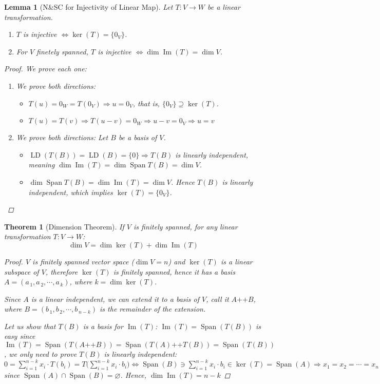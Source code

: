 \documentclass[12pt]{article}
\let\emptyset\varnothing
\let\RA\Rightarrow
\let\LA\Leftarrow
\let\LR\Leftrightarrow
\newcommand{\seq}[2]{\left({#1}_{\,1},{#1}_{\,2},\cdots,{#1}_{\,#2}\right)}
\DeclareMathOperator{\Image}{Im}
\DeclareMathOperator{\Span}{Span}
\DeclareMathOperator{\LD}{LD}
\DeclareMathOperator{\concat}{++}
\newtheorem{theorem}{Theorem}[subsection]
\newtheorem{lemma}{Lemma}[subsection]
\begin{document}
\begin{lemma}[N\&SC for Injectivity of Linear Map]
  Let $T: V \to W$ be a linear transformation.
  \begin{enumerate}
    \item $T$ is injective $\LR \ker(T)=\{0_V\}$.
    \item For $V$ finetely spanned, $T$ is injective $\LR \dim\Image(T)=\dim V$.
  \end{enumerate}
  \begin{proof}
    We prove each one:
    \begin{enumerate}
      \item We prove both directions:
      \begin{itemize}
        \item [$(\RA)$] $T(u)=0_W=T(0_V)\RA u=0_V$, that is, $\{0_V\}\supseteq \ker(T)$.
        \item [$(\LA)$] $T(u)=T(v)\RA T(u-v)=0_W\RA u-v=0_V\RA u=v$
      \end{itemize}
      \item We prove both directions:  Let $B$ be a basis of $V$. 
      \begin{itemize}
        \item [$(\RA)$] $\LD(T(B))=\LD(B)=\{0\}\RA T(B)$ is linearly independent, meaning $\dim\Image(T)=\dim\Span T(B)=\dim V$.
        \item [$(\LA)$] $\dim\Span T(B)=\dim\Image(T)=\dim V$. Hence $T(B)$ is linearly independent, which implies $\ker(T)=\{0_V\}$.
      \end{itemize}
    \end{enumerate}
  \end{proof}
\end{lemma}

\begin{theorem}[Dimension Theorem]
  If $V$ is finitely spanned, for any linear transformation $T: V\to W$: $$\boxed{\dim V=\dim\ker(T)+\dim \Image(T)}$$
  \begin{proof}
    $V$ is finitely spanned vector space ($\dim V=n$) and $\ker(T)$ is a linear subspace of $V$, therefore $\ker(T)$ is finitely spanned, hence it has a basis $A=\seq{a}{k}$, where $k=\dim\ker(T)$.

    Since $A$ is a linear independent, we can extend it to a basis of $V$, call it $A\concat B$, where $B=\seq{b}{n-k}$ is the remainder of the extension.
    
    Let us show that $T(B)$ is a basis for $\Image(T)$: $\Image(T)=\Span(T(B))$ is easy since $\Image(T)=\Span(T(A\concat B))=\Span(T(A)\concat T(B))=\Span(T(B))$, we only need to prove $T(B)$ is linearly independent: $\displaystyle 0=\sum_{i=1}^{n-k}x_i\cdot T(b_i)=T\bigg(\sum_{i=1}^{n-k}x_i\cdot b_i\bigg)\LR \Span(B)\ni\sum_{i=1}^{n-k}x_i\cdot b_i\in \ker(T)=\Span(A)\RA x_1=x_2=\cdots=x_{n-k}=0$ since $\Span(A)\cap \Span(B)=\emptyset$. Hence, $\dim\Image(T)=n-k$
  \end{proof}
\end{theorem}
\end{document}
